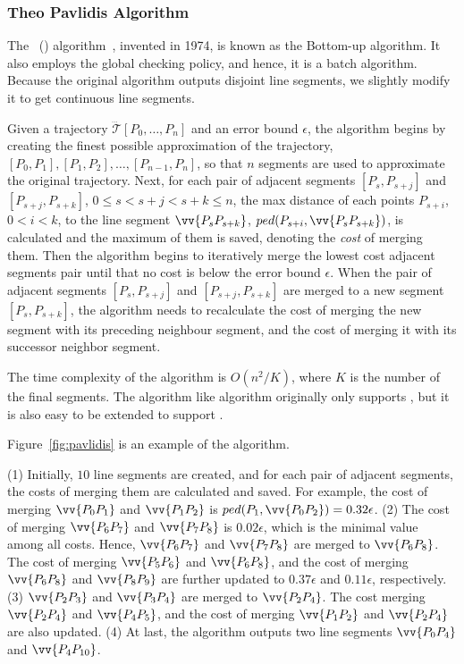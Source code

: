 \subsubsection{Theo Pavlidis Algorithm}

The {\pavlidis~(\tpa) algorithm}~\cite{Pavlidis:Segment}, invented in 1974, is known as the Bottom-up algorithm. It also employs the global checking policy, and hence, it is a batch algorithm. Because the original \tpa algorithm outputs disjoint line segments, we slightly modify it to get continuous line segments.

Given a trajectory $\dddot{\mathcal{T}}[P_0, \ldots, P_n]$ and an error bound $\epsilon$,
the algorithm begins by creating the finest possible approximation of the trajectory, \ie $[P_0, P_1], [P_1, P_2], \ldots,[P_{n-1}, P_n]$, so that $n$ segments are used to approximate the original trajectory.
Next, for each pair of adjacent segments $[P_{s}, P_{s+j}]$ and $[P_{s+j}, P_{s+k}]$, $0\le s<s+j < s+k \le n$,
the max distance of each points $P_{s+i}$, $0<i<k$, to the line segment $\vv{P_sP_{s+k}}$, \ie $ped(P_{s+i}, \vv{P_sP_{s+k}})$, is calculated and the maximum of them is saved, denoting the \emph{cost} of merging them.
Then the algorithm begins to iteratively merge the lowest cost adjacent segments pair
until that no cost is below the error bound $\epsilon$.
When the pair of adjacent segments $[P_{s}, P_{s+j}]$ and $[P_{s+j}, P_{s+k}]$ are merged to a new segment $[P_{s}, P_{s+k}]$, the algorithm needs to recalculate the cost of merging the new segment with its preceding neighbour segment, and the cost of merging it with its successor neighbor segment.

The time complexity of the algorithm is $O(n^2/K)$, where $K$ is the number of the final segments.
The \tpa algorithm like \dpa algorithm originally only supports \ped, but it is also easy to be extended to support \sed.


\begin{example}
\label{exm-alg-pavlidis}
Figure~\ref{fig:pavlidis} is an example of the \tpa algorithm.

\ni (1) Initially, $10$ line segments are created, and for each pair of adjacent segments, the costs of merging them are calculated and saved. For example, the cost of merging $\vv{P_0P_1}$ and $\vv{P_1P_2}$ is $ped(P_{1}, \vv{P_0P_{2}}) = 0.32\epsilon$.
%
(2) The cost of merging $\vv{P_6P_7}$ and $\vv{P_7P_8}$ is $0.02\epsilon$, which is the minimal value among all costs. Hence, $\vv{P_6P_7}$ and $\vv{P_7P_8}$ are merged to $\vv{P_6P_8}$. The cost of merging $\vv{P_5P_6}$ and $\vv{P_6P_8}$, and the cost of merging $\vv{P_6P_8}$ and $\vv{P_8P_9}$ are further updated to $0.37\epsilon$ and $0.11\epsilon$, respectively.
%
(3) $\vv{P_2P_3}$ and $\vv{P_3P_4}$ are merged to $\vv{P_2P_4}$. The cost merging $\vv{P_2P_4}$ and $\vv{P_4P_5}$, and the cost of merging $\vv{P_1P_2}$ and $\vv{P_2P_4}$ are also updated.
%
(4) At last, the algorithm outputs two line segments $\vv{P_0P_4}$ and $\vv{P_4P_{10}}$.
\end{example}

